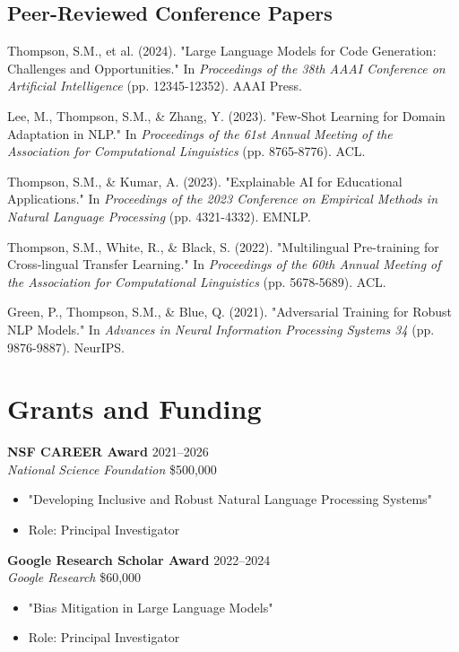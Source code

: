 \documentclass[11pt,letterpaper]{article}
\newcommand{\entry}[4]{\textbf{#1} \hfill #2 \\ \textit{#3} \hfill #4}
\newcommand{\publication}[1]{\item #1}
\begin{document}
\subsection{Peer-Reviewed Conference Papers}

\begin{etaremune}[leftmargin=0.5in]
\publication{Thompson, S.M., et al. (2024). "Large Language Models for Code Generation: Challenges and Opportunities." In \textit{Proceedings of the 38th AAAI Conference on Artificial Intelligence} (pp. 12345-12352). AAAI Press.}

\publication{Lee, M., Thompson, S.M., \& Zhang, Y. (2023). "Few-Shot Learning for Domain Adaptation in NLP." In \textit{Proceedings of the 61st Annual Meeting of the Association for Computational Linguistics} (pp. 8765-8776). ACL.}

\publication{Thompson, S.M., \& Kumar, A. (2023). "Explainable AI for Educational Applications." In \textit{Proceedings of the 2023 Conference on Empirical Methods in Natural Language Processing} (pp. 4321-4332). EMNLP.}

\publication{Thompson, S.M., White, R., \& Black, S. (2022). "Multilingual Pre-training for Cross-lingual Transfer Learning." In \textit{Proceedings of the 60th Annual Meeting of the Association for Computational Linguistics} (pp. 5678-5689). ACL.}

\publication{Green, P., Thompson, S.M., \& Blue, Q. (2021). "Adversarial Training for Robust NLP Models." In \textit{Advances in Neural Information Processing Systems 34} (pp. 9876-9887). NeurIPS.}
\end{etaremune}

\section{Grants and Funding}

\entry{NSF CAREER Award}{2021--2026}
{National Science Foundation}{\$500,000}
\begin{itemize}[noitemsep]
    \item "Developing Inclusive and Robust Natural Language Processing Systems"
    \item Role: Principal Investigator
\end{itemize}

\entry{Google Research Scholar Award}{2022--2024}
{Google Research}{\$60,000}
\begin{itemize}[noitemsep]
    \item "Bias Mitigation in Large Language Models"
    \item Role: Principal Investigator
\end{itemize}
\end{document}

